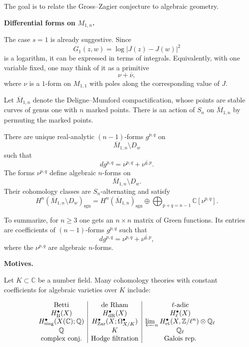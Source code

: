 The goal is to relate the
Gross--Zagier conjecture to algebraic
geometry.

\medskip\noindent
{\bf Differential forms on
$M_{1,n}$.}

The case $s=1$ is already suggestive.
Since
\[
        G_1(z,w)=\log|J(z)-J(w)|^2
\]
is a logarithm, it can be expressed
in terms of integrals. Equivalently,
with one variable fixed, one may think
of it as a primitive
\[
        \nu+\overline{\nu},
\]
where $\nu$ is a $1$-form on
$M_{1,1}$ with poles along the
corresponding value of $J$.

Let $\overline M_{1,n}$ denote the
Deligne--Mumford compactification,
whose points are stable curves of
genus one with $n$ marked points.
There is an action of $S_n$ on
$\overline M_{1,n}$ by permuting the
marked points.

\begin{theorem}
\label{theorem-unique-real}
There are unique real-analytic
$(n-1)$-forms $g^{p,q}$ on
\[
        \overline M_{1,n}\setminus D_w
\]
such that
\[
        d g^{p,q}
        =
        \nu^{p,q}
        +
        \overline{\nu^{q,p}}.
\]
The forms $\nu^{p,q}$ define algebraic
$n$-forms on
\[
        \overline M_{1,n}\setminus D_w.
\]
Their cohomology classes are
$S_n$-alternating and satisfy
\[
        H^n(
        \overline M_{1,n}\setminus D_w
        )_{\operatorname{sgn}}
        =
        H^n(\overline M_{1,n})
        _{\operatorname{sgn}}
        \oplus
        \bigoplus_{p+q=n-1}
        \mathbb C[\nu^{p,q}].
\]
\end{theorem}

To summarize, for $n\geq 3$ one gets
an $n\times n$ matrix of Green
functions.
Its entries are coefficients of
$(n-1)$-forms $g^{p,q}$ such that
\[
        d g^{p,q}
        =
        \nu^{p,q}
        +
        \overline{\nu^{q,p}},
\]
where the $\nu^{p,q}$ are algebraic
$n$-forms.

\medskip\noindent
{\bf Motives.}

Let $K\subset\mathbb C$ be a number
field.
Many cohomology theories with constant
coefficients for algebraic varieties
over $K$ include:

\[
\begin{array}{c|c|c}
\text{Betti} &
\text{de Rham} &
\ell\text{-adic} \\
H^\bullet_{\mathrm{B}}(X) &
H^\bullet_{\mathrm{dR}}(X) &
H^\bullet_\ell(X) \\
H^\bullet_{\mathrm{sing}}
(X(\mathbb C);\mathbb Q)
&
H^\bullet_{\mathrm{Zar}}
(X;\Omega^\bullet_{X/K})
&
\varprojlim_n
H^\bullet_{\mathrm{et}}
(X,\mathbb Z/\ell^n)
\otimes \mathbb Q_\ell
\\
\mathbb Q &
K &
\mathbb Q_\ell \\
{\rm complex~conj.} &
\text{Hodge filtration} &
\text{Galois rep.}
\end{array}
\]

